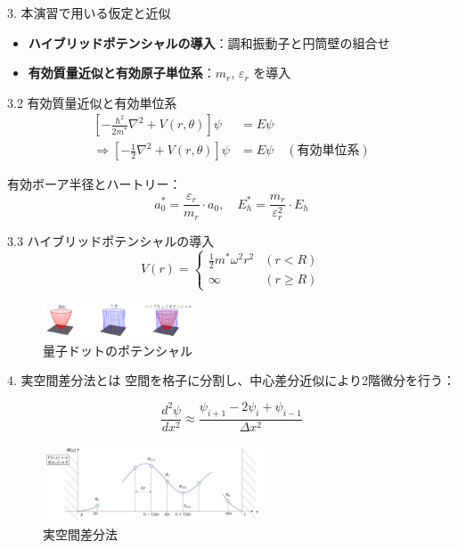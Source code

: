 \documentclass[dvipdfmx]{beamer}
\begin{document}
\begin{frame}{3. 本演習で用いる仮定と近似}
\begin{itemize}
  \item \textbf{ハイブリッドポテンシャルの導入}：調和振動子と円筒壁の組合せ
  \item \textbf{有効質量近似と有効原子単位系}：$m_r$, $\varepsilon_r$ を導入
\end{itemize}
\end{frame}

\begin{frame}{3.2 有効質量近似と有効単位系}
\begin{align*}
\left[ -\frac{\hbar^2}{2m^*} \nabla^2 + V(r,\theta) \right] \psi &= E \psi \\
\Rightarrow \left[ -\frac{1}{2} \nabla^2 + V(r,\theta) \right] \psi &= E \psi \quad (\text{有効単位系})
\end{align*}

有効ボーア半径とハートリー：
\[
a_0^* = \frac{\varepsilon_r}{m_r} \cdot a_0,\quad
E_h^* = \frac{m_r}{\varepsilon_r^2} \cdot E_h
\]
\end{frame}

\begin{frame}{3.3 ハイブリッドポテンシャルの導入}
\[
V(r) =
\begin{cases}
\frac{1}{2} m^* \omega^2 r^2 & (r < R) \\
\infty & (r \geq R)
\end{cases}
\]

\begin{figure}[H]
\centering
\includegraphics[width=0.4\textwidth]{images/三種盛り.png}
\caption{量子ドットのポテンシャル}
\end{figure}
\end{frame}

\begin{frame}{4. 実空間差分法とは}
空間を格子に分割し、中心差分近似により2階微分を行う：

\[
\frac{d^2 \psi}{dx^2} \approx \frac{\psi_{i+1} - 2\psi_i + \psi_{i-1}}{\Delta x^2}
\]

\begin{figure}[H]
\centering
\includegraphics[width=0.6\textwidth]{images/一次元.png}
\caption{実空間差分法}
\end{figure}
\end{frame}
\end{document}
